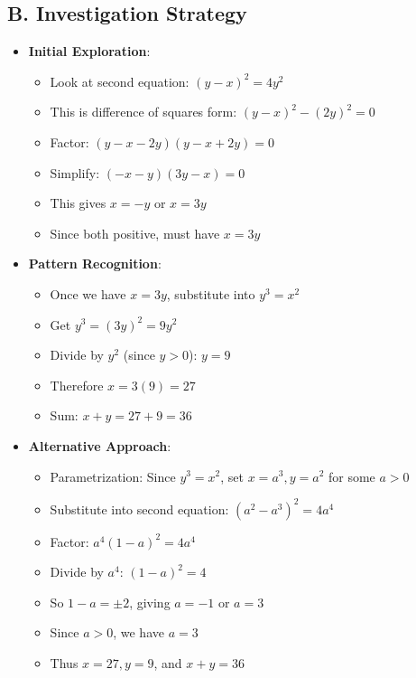 \documentclass[12pt]{article}
\begin{document}
\begin{strategicbox}
\subsection*{B. Investigation Strategy}
\begin{itemize}[leftmargin=*]
    \item \textbf{Initial Exploration}: 
    \begin{itemize}
        \item Look at second equation: $(y-x)^2 = 4y^2$
        \item This is difference of squares form: $(y-x)^2 - (2y)^2 = 0$
        \item Factor: $(y-x-2y)(y-x+2y) = 0$
        \item Simplify: $(-x-y)(3y-x) = 0$
        \item This gives $x = -y$ or $x = 3y$
        \item Since both positive, must have $x = 3y$
    \end{itemize}
    \item \textbf{Pattern Recognition}: 
    \begin{itemize}
        \item Once we have $x = 3y$, substitute into $y^3 = x^2$
        \item Get $y^3 = (3y)^2 = 9y^2$
        \item Divide by $y^2$ (since $y > 0$): $y = 9$
        \item Therefore $x = 3(9) = 27$
        \item Sum: $x + y = 27 + 9 = 36$
    \end{itemize}
    \item \textbf{Alternative Approach}: 
    \begin{itemize}
        \item Parametrization: Since $y^3 = x^2$, set $x = a^3, y = a^2$ for some $a > 0$
        \item Substitute into second equation: $(a^2 - a^3)^2 = 4a^4$
        \item Factor: $a^4(1-a)^2 = 4a^4$
        \item Divide by $a^4$: $(1-a)^2 = 4$
        \item So $1-a = \pm 2$, giving $a = -1$ or $a = 3$
        \item Since $a > 0$, we have $a = 3$
        \item Thus $x = 27, y = 9$, and $x+y = 36$
    \end{itemize}
\end{itemize}


\end{strategicbox}
\end{document}
